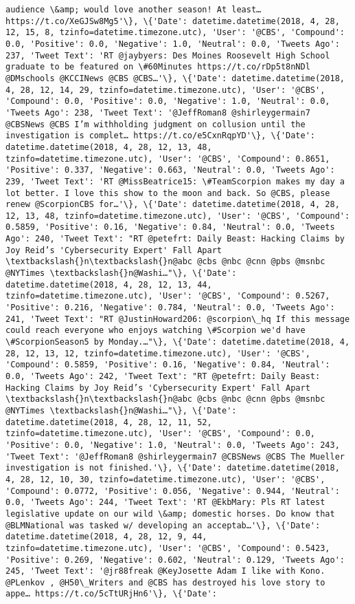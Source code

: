 \documentclass[11pt]{article}
\begin{document}
\begin{Verbatim}[commandchars=\\\{\}]
audience \&amp; would love another season! At least… https://t.co/XeGJSw8Mg5'\}, \{'Date': datetime.datetime(2018, 4, 28, 12, 15, 8, tzinfo=datetime.timezone.utc), 'User': '@CBS', 'Compound': 0.0, 'Positive': 0.0, 'Negative': 1.0, 'Neutral': 0.0, 'Tweets Ago': 237, 'Tweet Text': 'RT @jaybyers: Des Moines Roosevelt High School graduate to be featured on \#60Minutes https://t.co/rDp5t8nNDl @DMschools @KCCINews @CBS @CBS…'\}, \{'Date': datetime.datetime(2018, 4, 28, 12, 14, 29, tzinfo=datetime.timezone.utc), 'User': '@CBS', 'Compound': 0.0, 'Positive': 0.0, 'Negative': 1.0, 'Neutral': 0.0, 'Tweets Ago': 238, 'Tweet Text': '@JeffRoman8 @shirleygermain7 @CBSNews @CBS I’m withholding judgment on collusion until the investigation is complet… https://t.co/e5CxnRqpYD'\}, \{'Date': datetime.datetime(2018, 4, 28, 12, 13, 48, tzinfo=datetime.timezone.utc), 'User': '@CBS', 'Compound': 0.8651, 'Positive': 0.337, 'Negative': 0.663, 'Neutral': 0.0, 'Tweets Ago': 239, 'Tweet Text': 'RT @MissBeatrice15: \#TeamScorpion makes my day a lot better. I love this show to the moon and back. So @CBS, please renew @ScorpionCBS for…'\}, \{'Date': datetime.datetime(2018, 4, 28, 12, 13, 48, tzinfo=datetime.timezone.utc), 'User': '@CBS', 'Compound': 0.5859, 'Positive': 0.16, 'Negative': 0.84, 'Neutral': 0.0, 'Tweets Ago': 240, 'Tweet Text': "RT @petefrt: Daily Beast: Hacking Claims by Joy Reid’s 'Cybersecurity Expert' Fall Apart \textbackslash{}n\textbackslash{}n@abc @cbs @nbc @cnn @pbs @msnbc @NYTimes \textbackslash{}n@Washi…"\}, \{'Date': datetime.datetime(2018, 4, 28, 12, 13, 44, tzinfo=datetime.timezone.utc), 'User': '@CBS', 'Compound': 0.5267, 'Positive': 0.216, 'Negative': 0.784, 'Neutral': 0.0, 'Tweets Ago': 241, 'Tweet Text': "RT @JustinHoward206: @scorpion\_hq If this message could reach everyone who enjoys watching \#Scorpion we'd have \#ScorpionSeason5 by Monday.…"\}, \{'Date': datetime.datetime(2018, 4, 28, 12, 13, 12, tzinfo=datetime.timezone.utc), 'User': '@CBS', 'Compound': 0.5859, 'Positive': 0.16, 'Negative': 0.84, 'Neutral': 0.0, 'Tweets Ago': 242, 'Tweet Text': "RT @petefrt: Daily Beast: Hacking Claims by Joy Reid’s 'Cybersecurity Expert' Fall Apart \textbackslash{}n\textbackslash{}n@abc @cbs @nbc @cnn @pbs @msnbc @NYTimes \textbackslash{}n@Washi…"\}, \{'Date': datetime.datetime(2018, 4, 28, 12, 11, 52, tzinfo=datetime.timezone.utc), 'User': '@CBS', 'Compound': 0.0, 'Positive': 0.0, 'Negative': 1.0, 'Neutral': 0.0, 'Tweets Ago': 243, 'Tweet Text': '@JeffRoman8 @shirleygermain7 @CBSNews @CBS The Mueller investigation is not finished.'\}, \{'Date': datetime.datetime(2018, 4, 28, 12, 10, 30, tzinfo=datetime.timezone.utc), 'User': '@CBS', 'Compound': 0.0772, 'Positive': 0.056, 'Negative': 0.944, 'Neutral': 0.0, 'Tweets Ago': 244, 'Tweet Text': 'RT @EkbMary: Pls RT latest legislative update on our wild \&amp; domestic horses. Do know that @BLMNational was tasked w/ developing an acceptab…'\}, \{'Date': datetime.datetime(2018, 4, 28, 12, 9, 44, tzinfo=datetime.timezone.utc), 'User': '@CBS', 'Compound': 0.5423, 'Positive': 0.269, 'Negative': 0.602, 'Neutral': 0.129, 'Tweets Ago': 245, 'Tweet Text': '@jr88freak @KeyJosette Adam I like with Kono. @PLenkov , @H50\_Writers and @CBS has destroyed his love story to appe… https://t.co/5cTtURjHn6'\}, \{'Date': 
\end{Verbatim}
\end{document}
